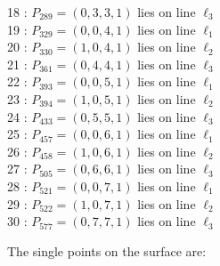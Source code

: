 \documentclass{article}
\begin{document}
{\begin{multicols}{2}
18 : $P_{289}=( 0, 3, 3, 1 )$ lies on line $\ell_{3}$\\
19 : $P_{329}=( 0, 0, 4, 1 )$ lies on line $\ell_{1}$\\
20 : $P_{330}=( 1, 0, 4, 1 )$ lies on line $\ell_{2}$\\
21 : $P_{361}=( 0, 4, 4, 1 )$ lies on line $\ell_{3}$\\
22 : $P_{393}=( 0, 0, 5, 1 )$ lies on line $\ell_{1}$\\
23 : $P_{394}=( 1, 0, 5, 1 )$ lies on line $\ell_{2}$\\
24 : $P_{433}=( 0, 5, 5, 1 )$ lies on line $\ell_{3}$\\
25 : $P_{457}=( 0, 0, 6, 1 )$ lies on line $\ell_{1}$\\
26 : $P_{458}=( 1, 0, 6, 1 )$ lies on line $\ell_{2}$\\
27 : $P_{505}=( 0, 6, 6, 1 )$ lies on line $\ell_{3}$\\
28 : $P_{521}=( 0, 0, 7, 1 )$ lies on line $\ell_{1}$\\
29 : $P_{522}=( 1, 0, 7, 1 )$ lies on line $\ell_{2}$\\
30 : $P_{577}=( 0, 7, 7, 1 )$ lies on line $\ell_{3}$\\
\end{multicols}
The single points on the surface are:\\
}
\end{document}
